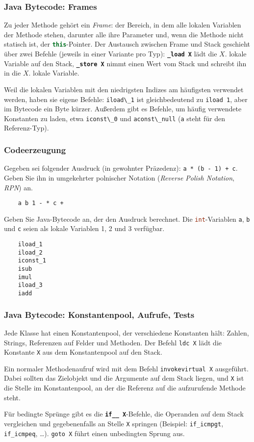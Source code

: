 \documentclass{beamer}
\begin{document}
\begin{frame}
  \frametitle{Java Bytecode: Frames}
  Zu jeder Methode gehört ein \textit{Frame}:
  der Bereich, in dem alle lokalen Variablen der Methode stehen,
  darunter alle ihre Parameter und, wenn die Methode nicht statisch ist, der \lstinline[language=Java]{this}-Pointer.
  Der Austausch zwischen Frame und Stack geschieht über zwei Befehle
  (jeweils in einer Variante pro Typ):
  \textbf{\texttt{\_load X}} lädt die $X$. lokale Variable auf den Stack,
  \textbf{\texttt{\_store X}} nimmt einen Wert vom Stack und schreibt ihn in die $X$. lokale Variable.
  
  Weil die lokalen Variablen mit den niedrigsten Indizes am häufigsten verwendet werden,
  haben sie eigene Befehle:
  \lstinline{iload\_1} ist gleichbedeutend zu \lstinline{iload 1},
  aber im Bytecode ein Byte kürzer.
  Außerdem gibt es Befehle,
  um häufig verwendete Konstanten zu laden,
  etwa \lstinline{iconst\_0} und \lstinline{aconst\_null}
  (\lstinline{a} steht für den Referenz-Typ).
\end{frame}

\begin{frame}[fragile]
  \frametitle{Codeerzeugung}
  Gegeben sei folgender Ausdruck (in gewohnter Präzedenz): \lstinline{a * (b - 1) + c}.
  Geben Sie ihn in umgekehrter polnischer Notation (\emph{Reverse Polish Notation}, \emph{RPN}) an.
  \pause
  \begin{lstlisting}
    a b 1 - * c +
  \end{lstlisting}
  \pause
  Geben Sie Java-Bytecode an, der den Ausdruck berechnet.
  Die \lstinline[language=Java]{int}-Variablen \lstinline{a}, \lstinline{b} und \lstinline{c} seien als lokale Variablen 1, 2 und 3 verfügbar.
  \pause
  \begin{lstlisting}
    iload_1
    iload_2
    iconst_1
    isub
    imul
    iload_3
    iadd
  \end{lstlisting}
\end{frame}

\begin{frame}
  \frametitle{Java Bytecode: Konstantenpool, Aufrufe, Tests}
  Jede Klasse hat einen Konstantenpool, der verschiedene Konstanten hält:
  Zahlen, Strings, Referenzen auf Felder und Methoden.
  Der Befehl \lstinline{ldc X} lädt die Konstante \texttt{X} aus dem Konstantenpool auf den Stack.
  
  Ein normaler Methodenaufruf wird mit dem Befehl \lstinline{invokevirtual X} ausgeführt.
  Dabei sollten das Zielobjekt und die Argumente auf dem Stack liegen,
  und \texttt{X} ist die Stelle im Konstantenpool,
  an der die Referenz auf die aufzurufende Methode steht.
  
  Für bedingte Sprünge gibt es die \textbf{\texttt{if\_\_ X}}-Befehle,
  die Operanden auf dem Stack vergleichen und gegebenenfalls an Stelle \texttt{X} springen
  (Beispiel: \lstinline{if_icmpgt}, \lstinline{if_icmpeq}, …).
  \lstinline{goto X} führt einen unbedingten Sprung aus.
\end{frame}
\end{document}
